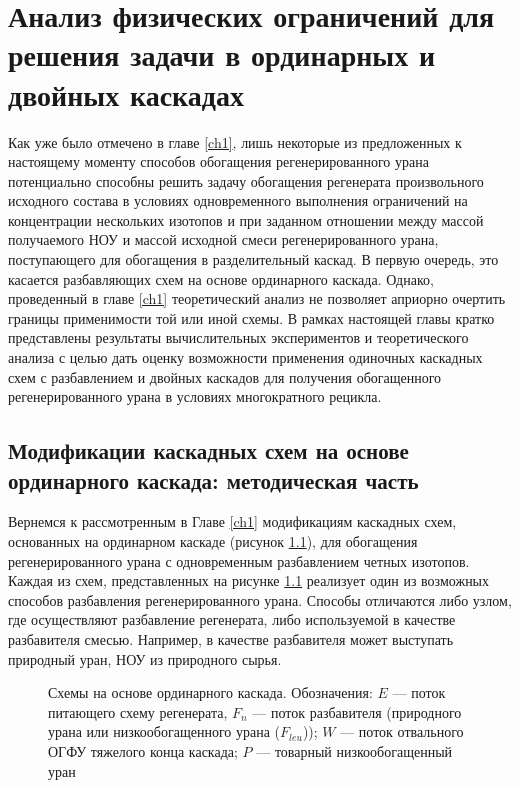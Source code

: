 \chapter{Анализ физических ограничений для решения задачи в ординарных и двойных каскадах}\label{ch:ch2}

Как уже было отмечено в главе \ref{ch1}, лишь некоторые из предложенных к настоящему моменту способов обогащения регенерированного урана потенциально способны решить задачу обогащения регенерата произвольного исходного состава в условиях одновременного выполнения ограничений на концентрации нескольких изотопов и при заданном отношении между массой получаемого НОУ и массой исходной смеси регенерированного урана, поступающего для обогащения в разделительный каскад. В первую очередь, это касается разбавляющих схем на основе ординарного каскада. 
Однако, проведенный в главе \ref{ch1} теоретический анализ не позволяет априорно очертить границы применимости той или иной схемы. В рамках настоящей главы кратко представлены результаты вычислительных экспериментов и теоретического анализа с целью дать оценку возможности применения одиночных каскадных схем с разбавлением и двойных каскадов для получения обогащенного регенерированного урана в условиях многократного рецикла. 

\section{Модификации каскадных схем на основе ординарного каскада: методическая часть}\label{ch2_stat}

Вернемся к рассмотренным в Главе \ref{ch1} модификациям каскадных схем, основанных на ординарном каскаде (рисунок \ref{fig:diagram1ch3}), для обогащения регенерированного урана с одновременным разбавлением четных изотопов. Каждая из схем, представленных на рисунке \ref{fig:diagram1ch3} реализует один из возможных способов разбавления регенерированного урана. Способы отличаются либо узлом, где осуществляют разбавление регенерата, либо используемой в качестве разбавителя смесью. Например, в качестве разбавителя может выступать природный уран, НОУ из природного сырья.

\begin{figure}[ht]
  \caption{Схемы на основе ординарного каскада. Обозначения: $E$ --- поток питающего схему регенерата, $F_n$ --- поток разбавителя (природного урана или низкообогащенного урана ($F_{leu}$)); $W$ --- поток отвального ОГФУ тяжелого конца каскада; $P$ --- товарный низкообогащенный уран}\label{fig:diagram1ch3}
\end{figure}

